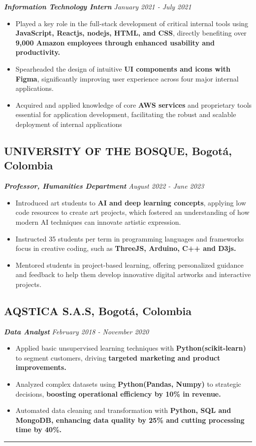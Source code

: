 \documentclass[10pt,a4paper]{article}
\begin{document}
{\fontsize{11}{12} \textbf{\textit{Information Technology Intern}}} \hfill \textit{January 2021 - July 2021}
\begin{itemize}[noitemsep]
    \item Played a key role in the full-stack development of critical internal tools using \textbf{JavaScript, Reactjs, nodejs, HTML, and CSS}, directly benefiting over \textbf{9,000 Amazon employees through enhanced usability and productivity.}
    \item Spearheaded the design of intuitive \textbf{UI components and icons with Figma}, significantly improving user experience across four major internal applications.
    \item Acquired and applied knowledge of core \textbf{AWS services} and proprietary tools essential for application development, facilitating the robust and scalable deployment of internal applications
\end{itemize}

\subsection*{UNIVERSITY OF THE BOSQUE, Bogotá, Colombia}
{\fontsize{11}{12} \textbf{\textit{Professor, Humanities Department}}} \hfill \textit{August 2022 - June 2023}
\begin{itemize}[noitemsep]
    \item Introduced art students to \textbf{AI and deep learning concepts}, applying low code resources to create  art projects, which fostered an understanding of how modern AI techniques can innovate artistic expression.
    \item Instructed 35 students per term in programming languages and frameworks focus in creative coding, such as \textbf{ThreeJS, Arduino, C++ and D3js.}
    \item Mentored students in project-based learning, offering personalized guidance and feedback to help them develop innovative digital artworks and interactive projects.
\end{itemize}

\subsection*{AQSTICA S.A.S, Bogotá, Colombia}
{\fontsize{11}{12} \textbf{\textit{Data Analyst}}} \hfill \textit{February 2018 - November 2020}
\begin{itemize}[noitemsep]
    \item Applied basic unsupervised learning techniques with \textbf{Python(scikit-learn)} to segment customers, driving \textbf{targeted marketing and product improvements.}
    \item Analyzed complex datasets using \textbf{Python(Pandas, Numpy)} to strategic decisions, \textbf{boosting operational efficiency by 10\% in revenue.}
    \item Automated data cleaning and transformation with \textbf{Python, SQL and MongoDB, enhancing data quality by 25\% and cutting processing time by 40\%.}
\end{itemize}
\rule{\textwidth}{0.4pt} 
\end{document}
